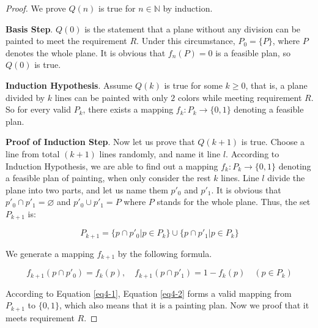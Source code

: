 \documentclass[12pt,a4paper]{article}
\theoremstyle{definition}
\begin{document}
\begin{enumerate}
\begin{proof}
        We prove $Q(n)$ is true for $n \in \mathbb{N}$ by induction.

        \textbf{\color{blue}Basis Step}. $Q(0)$ is the statement that a plane without any division can be painted to meet the requirement $R$. Under this circumstance, $P_0 = \{P\}$, where $P$ denotes the whole plane. It is obvious that $f_n(P) = 0$ is a feasible plan, so $Q(0)$ is true.

        \textbf{\color{blue}Induction Hypothesis}. Assume $Q(k)$ is true for some $k \geq 0$, that is, a plane divided by $k$ lines can be painted with only $2$ colors while meeting requirement $R$. So for every valid $P_k$, there exists a mapping $f_k: P_k \rightarrow \{0, 1\}$ denoting a feasible plan.

        \textbf{\color{blue}Proof of Induction Step}. Now let us prove that $Q(k+1)$ is true. Choose a line from total $(k+1)$ lines randomly, and name it line $l$. According to Induction Hypothesis, we are able to find out a mapping $f_k: P_k \rightarrow \{0, 1\}$ denoting a feasible plan of painting, when only consider the rest $k$ lines. Line $l$ divide the plane into two parts, and let us name them $p'_0$ and $p'_1$. It is obvious that $p'_0 \cap p'_1 = \varnothing$ and $p'_0 \cup p'_1 = P$ where $P$ stands for the whole plane. Thus, the set $P_{k+1}$ is:

        \begin{equation}\label{eq4-1}
            P_{k+1} = \{p \cap p'_0 | p \in P_k \} \cup \{p \cap p'_1 | p \in P_k \}
        \end{equation}

        We generate a mapping $f_{k+1}$ by the following formula.

        \begin{equation}\label{eq4-2}
        f_{k+1}(p \cap p'_0) = f_{k}(p), \quad f_{k+1}(p \cap p'_1) = 1 - f_{k}(p) \quad  (p \in P_k)
        \end{equation}

        According to Equation \eqref{eq4-1}, Equation \eqref{eq4-2} forms a valid mapping from $P_{k+1}$ to $\{0,1\}$, which also means that it is a painting plan. Now we proof that it meets requirement $R$.


\end{proof}
\end{enumerate}
\end{document}
